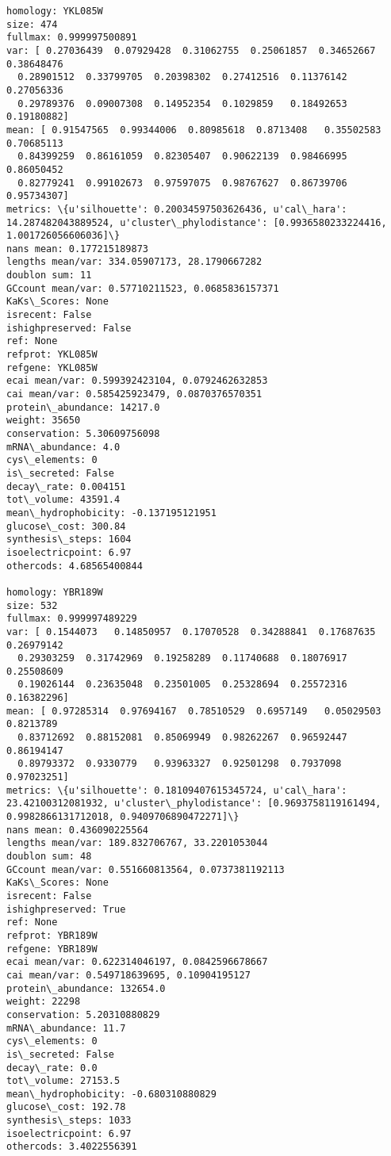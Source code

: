 \documentclass[11pt]{article}
\begin{document}
\begin{Verbatim}[commandchars=\\\{\}]
homology: YKL085W
size: 474
fullmax: 0.999997500891
var: [ 0.27036439  0.07929428  0.31062755  0.25061857  0.34652667  0.38648476
  0.28901512  0.33799705  0.20398302  0.27412516  0.11376142  0.27056336
  0.29789376  0.09007308  0.14952354  0.1029859   0.18492653  0.19180882]
mean: [ 0.91547565  0.99344006  0.80985618  0.8713408   0.35502583  0.70685113
  0.84399259  0.86161059  0.82305407  0.90622139  0.98466995  0.86050452
  0.82779241  0.99102673  0.97597075  0.98767627  0.86739706  0.95734307]
metrics: \{u'silhouette': 0.20034597503626436, u'cal\_hara': 14.287482043889524, u'cluster\_phylodistance': [0.9936580233224416, 1.001726056606036]\}
nans mean: 0.177215189873
lengths mean/var: 334.05907173, 28.1790667282
doublon sum: 11
GCcount mean/var: 0.57710211523, 0.0685836157371
KaKs\_Scores: None
isrecent: False
ishighpreserved: False
ref: None
refprot: YKL085W
refgene: YKL085W
ecai mean/var: 0.599392423104, 0.0792462632853
cai mean/var: 0.585425923479, 0.0870376570351
protein\_abundance: 14217.0
weight: 35650
conservation: 5.30609756098
mRNA\_abundance: 4.0
cys\_elements: 0
is\_secreted: False
decay\_rate: 0.004151
tot\_volume: 43591.4
mean\_hydrophobicity: -0.137195121951
glucose\_cost: 300.84
synthesis\_steps: 1604
isoelectricpoint: 6.97
othercods: 4.68565400844

homology: YBR189W
size: 532
fullmax: 0.999997489229
var: [ 0.1544073   0.14850957  0.17070528  0.34288841  0.17687635  0.26979142
  0.29303259  0.31742969  0.19258289  0.11740688  0.18076917  0.25508609
  0.19026144  0.23635048  0.23501005  0.25328694  0.25572316  0.16382296]
mean: [ 0.97285314  0.97694167  0.78510529  0.6957149   0.05029503  0.8213789
  0.83712692  0.88152081  0.85069949  0.98262267  0.96592447  0.86194147
  0.89793372  0.9330779   0.93963327  0.92501298  0.7937098   0.97023251]
metrics: \{u'silhouette': 0.18109407615345724, u'cal\_hara': 23.42100312081932, u'cluster\_phylodistance': [0.9693758119161494, 0.9982866131712018, 0.9409706890472271]\}
nans mean: 0.436090225564
lengths mean/var: 189.832706767, 33.2201053044
doublon sum: 48
GCcount mean/var: 0.551660813564, 0.0737381192113
KaKs\_Scores: None
isrecent: False
ishighpreserved: True
ref: None
refprot: YBR189W
refgene: YBR189W
ecai mean/var: 0.622314046197, 0.0842596678667
cai mean/var: 0.549718639695, 0.10904195127
protein\_abundance: 132654.0
weight: 22298
conservation: 5.20310880829
mRNA\_abundance: 11.7
cys\_elements: 0
is\_secreted: False
decay\_rate: 0.0
tot\_volume: 27153.5
mean\_hydrophobicity: -0.680310880829
glucose\_cost: 192.78
synthesis\_steps: 1033
isoelectricpoint: 6.97
othercods: 3.4022556391


\end{Verbatim}
\end{document}
